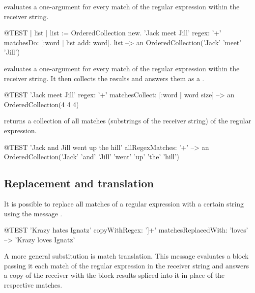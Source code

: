\documentclass[a4paper,10pt,twoside]{book}
\begin{document}
{ evaluates a one-argument  for every match of the regular expression within the receiver string.

\begin{code}{@TEST | list |}
list := OrderedCollection new.
'Jack meet Jill' regex: '\w+' matchesDo: [:word | list add: word].
list --> an OrderedCollection('Jack' 'meet' 'Jill')
\end{code}

 evaluates a one-argument  for every match of the regular expression within the receiver string. It then collects the results and answers them as a .

\begin{code}{@TEST}
'Jack meet Jill' regex: '\w+' matchesCollect: [:word | word size]                          --> an OrderedCollection(4 4 4)
\end{code}

 returns a collection of all matches (substrings of the receiver string) of the regular expression.

\begin{code}{@TEST}
'Jack and Jill went up the hill' allRegexMatches: '\w+'                                            --> an OrderedCollection('Jack' 'and' 'Jill' 'went' 'up' 'the' 'hill')
\end{code}

\subsection{Replacement and translation}

It is possible to replace all matches of a regular expression with a certain string using the message .

\begin{code}{@TEST}
'Krazy hates Ignatz' copyWithRegex: '\<[[:lower:]]+\>' matchesReplacedWith: 'loves' --> 'Krazy loves Ignatz'
\end{code}

A more general substitution is match translation. This message evaluates a block passing it each match of the regular expression in the receiver string and answers a copy of the receiver with the block results spliced into it in place of the respective matches.

}
\end{document}
